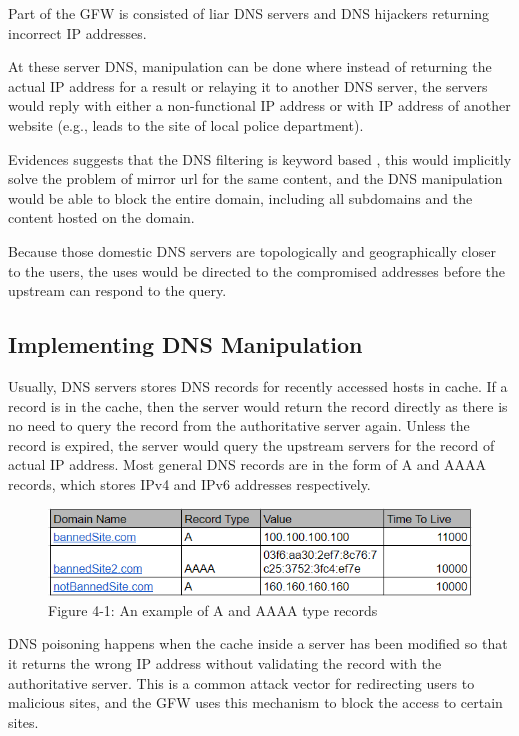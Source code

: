 \documentclass[nonacm,sigplan,screen]{acmart}
\begin{document}
Part of the GFW is consisted of liar DNS servers and DNS hijackers
returning incorrect IP addresses.

At these server DNS, manipulation can be done where instead of returning
the actual IP address for a result or relaying it to another DNS server,
the servers would reply with either a non-functional IP address or with
IP address of another website (e.g., leads to the site of local police
department).

Evidences suggests that the DNS filtering is keyword based
\cite{21_dnsCompreh} , this would implicitly solve the problem of mirror
url for the same content, and the DNS manipulation would be able to
block the entire domain, including all subdomains and the content hosted
on the domain.

Because those domestic DNS servers are topologically and geographically
closer to the users, the uses would be directed to the compromised
addresses before the upstream can respond to the query.

\hypertarget{Implementing DNS Manipulation}{
\subsection{Implementing DNS Manipulation}\label{implementing DNS Manipulation}}

Usually, DNS servers stores DNS records for recently accessed hosts in
cache. If a record is in the cache, then the server would return the
record directly as there is no need to query the record from the
authoritative server again. \cite{22_dnsConcepts} Unless the record is
expired, the server would query the upstream servers for the record of
actual IP address. Most general DNS records are in the form of A and
AAAA records, which stores IPv4 and IPv6 addresses respectively.

\begin{figure}
\centering
\includegraphics[width=\columnwidth]{res/4.1-DNS.png}
\caption{Figure 4-1: An example of A and AAAA type records}
\end{figure}

DNS poisoning happens when the cache inside a server has been modified
so that it returns the wrong IP address without validating the record
with the authoritative server. This is a common attack vector for
redirecting users to malicious sites, and the GFW uses this mechanism to
block the access to certain sites.
\end{document}

